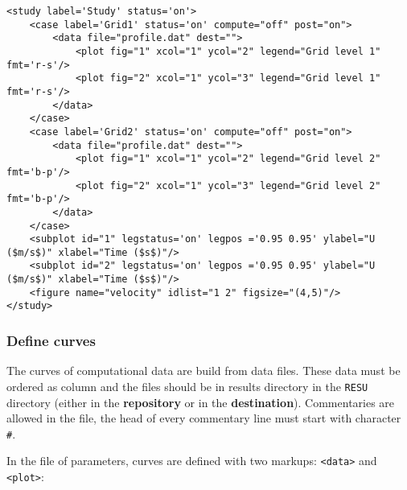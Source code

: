 \documentclass[a4paper,10pt,twoside]{csshortdoc}
\begin{document}
\small
\begin{verbatim}
<study label='Study' status='on'>
    <case label='Grid1' status='on' compute="off" post="on">
        <data file="profile.dat" dest="">
            <plot fig="1" xcol="1" ycol="2" legend="Grid level 1" fmt='r-s'/>
            <plot fig="2" xcol="1" ycol="3" legend="Grid level 1" fmt='r-s'/>
        </data>
    </case>
    <case label='Grid2' status='on' compute="off" post="on">
        <data file="profile.dat" dest="">
            <plot fig="1" xcol="1" ycol="2" legend="Grid level 2" fmt='b-p'/>
            <plot fig="2" xcol="1" ycol="3" legend="Grid level 2" fmt='b-p'/>
        </data>
    </case>
    <subplot id="1" legstatus='on' legpos ='0.95 0.95' ylabel="U ($m/s$)" xlabel="Time ($s$)"/>
    <subplot id="2" legstatus='on' legpos ='0.95 0.95' ylabel="U ($m/s$)" xlabel="Time ($s$)"/>
    <figure name="velocity" idlist="1 2" figsize="(4,5)"/>
</study>
\end{verbatim}
\normalsize

\subsubsection{Define curves}

The curves of computational data are build from data files. These data must be
ordered as column and the files should be in results directory in the
\texttt{RESU} directory (either in the \textbf{repository} or in the
\textbf{destination}). Commentaries are allowed in the file, the head of every
commentary line must start with character \texttt{\#}.

In the file of parameters, curves are defined with two markups:
\texttt{<data>} and \texttt{<plot>}:
\end{document}
